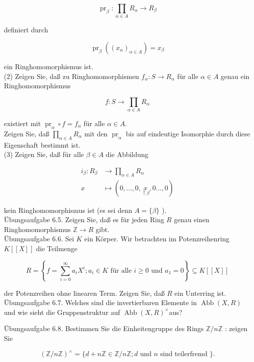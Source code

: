\documentclass[10pt, letterpaper]{article}
\begin{document}
$$
\operatorname{pr}_{\beta}: \prod_{\alpha \in A} R_{\alpha} \rightarrow R_{\beta}
$$

definiert durch

$$
\operatorname{pr}_{\beta}\left(\left(x_{\alpha}\right)_{\alpha \in A}\right)=x_{\beta}
$$

ein Ringhomomorphismus ist.\\
(2) Zeigen Sie, daß zu Ringhomomorphismen $f_{\alpha}: S \rightarrow R_{\alpha}$ für alle $\alpha \in A$ genau ein Ringhomomorphismus

$$
f: S \rightarrow \prod_{\alpha \in A} R_{\alpha}
$$

existiert mit $\operatorname{pr}_{\alpha} \circ f=f_{\alpha}$ für alle $\alpha \in A$.\\
Zeigen Sie, daß $\prod_{\alpha \in A} R_{\alpha}$ mit den $\operatorname{pr}_{\alpha}$ bis auf eindeutige Isomorphie durch diese Eigenschaft bestimmt ist.\\
(3) Zeigen Sie, daß für alle $\beta \in A$ die Abbildung

$$
\begin{aligned}
i_{\beta}: R_{\beta} & \rightarrow \prod_{\alpha \in A} R_{\alpha} \\
x & \mapsto(0, \ldots, 0, \underset{\uparrow \beta}{x}, 0 \ldots, 0)
\end{aligned}
$$

kein Ringhomomorphismus ist (es sei denn $A=\{\beta\}$ ).\\
Übungsaufgabe 6.5. Zeigen Sie, daß es für jeden Ring $R$ genau einen Ringhomomorphismus $\mathbb{Z} \rightarrow R$ gibt.\\
Übungsaufgabe 6.6. Sei $K$ ein Körper. Wir betrachten im Potenzreihenring $K[[X]]$ die Teilmenge

$$
R=\left\{f=\sum_{i=0}^{\infty} a_{i} X^{i} ; a_{i} \in K \text { für alle } i \geq 0 \text { und } a_{1}=0\right\} \subseteq K[[X]]
$$

der Potenzreihen ohne linearen Term. Zeigen Sie, daß $R$ ein Unterring ist.\\
Übungsaufgabe 6.7. Welches sind die invertierbaren Elemente in $\operatorname{Abb}(X, R)$ und wie sieht die Gruppenstruktur auf $\operatorname{Abb}(X, R)^{\times}$aus?

Übungsaufgabe 6.8. Bestimmen Sie die Einheitengruppe des Rings $\mathbb{Z} / n \mathbb{Z}$ : zeigen Sie

$$
(\mathbb{Z} / n \mathbb{Z})^{\times}=\{d+n \mathbb{Z} \in \mathbb{Z} / n \mathbb{Z} ; d \text { und } n \text { sind teilerfremd }\} .
$$
\end{document}
